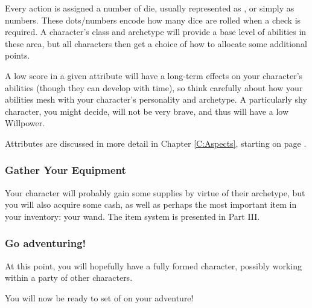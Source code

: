 Every action is assigned a number of die, usually represented as , or simply as numbers. These dots/numbers encode how many dice are rolled when a check is required. A character's class and archetype will provide a base level of abilities in these area, but all characters then get a choice of how to allocate some additional points. 

A low score in a given attribute will have a long-term effects on your character's abilities (though they can develop with time), so think carefully about how your abilities mesh with your character's personality and archetype. A particularly shy character, you might decide, will not be very brave, and thus will have a low Willpower. 

Attributes are discussed in more detail in Chapter \ref{C:Aspects}, starting on page \pageref{C:Aspects}.

\subsubsection*{\itemlist{} Gather Your Equipment}

Your character will probably gain some supplies by virtue of their archetype, but you will also acquire some cash, as well as perhaps the most important item in your inventory: your wand. The item system is presented in Part III.

\subsubsection*{\itemlist{} Go adventuring!}

At this point, you will hopefully have a fully formed character, possibly working within a party of other characters. 

You will now be ready to set of on your adventure!
